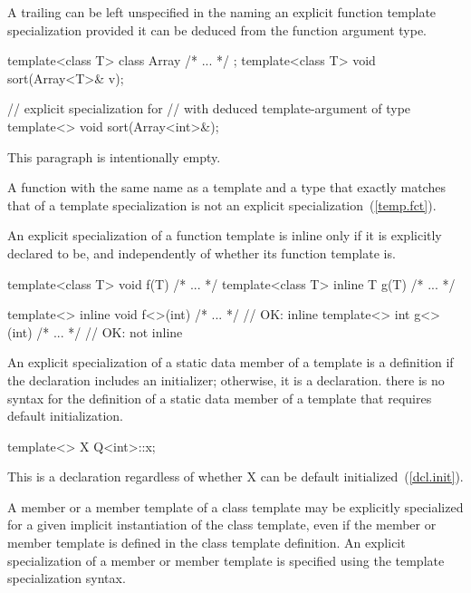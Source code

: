 \pnum
A trailing
can be left unspecified in the
naming an explicit function template specialization
provided it can be deduced from the function argument type.
\enterexample

\begin{codeblock}
template<class T> class Array { /* ... */ };
template<class T> void sort(Array<T>& v);

// explicit specialization for 
// with deduced template-argument of type 
template<> void sort(Array<int>&);
\end{codeblock}
\exitexampleb

\pnum
\enternote This paragraph is intentionally empty. \exitnote

\pnum
A function with the same name as a template and a type that exactly matches that
of a template specialization is not an explicit specialization~(\ref{temp.fct}).

\pnum
An explicit specialization of a function template is inline
only if it is explicitly declared to be, and independently of whether its
function template is.
\enterexample

\begin{codeblock}
template<class T> void f(T) { /* ... */ }
template<class T> inline T g(T) { /* ... */ }

template<> inline void f<>(int) { /* ... */ }   // OK: inline
template<> int g<>(int) { /* ... */ }           // OK: not inline
\end{codeblock}
\exitexampleb

\pnum
An explicit specialization of a static data member of a template is a
definition if the declaration includes an initializer;
otherwise, it is a declaration.
\enternote
there is no syntax for the definition of a static data member of a template
that requires default initialization.

\begin{codeblock}
template<> X Q<int>::x;
\end{codeblock}

This is a declaration regardless of whether X can be default
initialized~(\ref{dcl.init}).
\exitnote

\pnum
A member or a member template of a class template may be explicitly specialized
for a given implicit instantiation of the class template, even if the member
or member template is defined in the class template definition.
An explicit specialization of a member or member template is specified using the
template specialization syntax.
\enterexample

